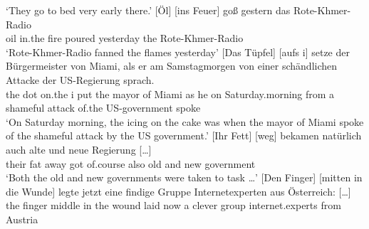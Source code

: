 \glt `They go to bed very early there.'
%
%
\ex 
\gll {}[Öl] [ins Feuer] goß gestern das Rote-Khmer-Radio\footnotemark\\
	 \spacebr{}oil \spacebr{}in.the fire poured yesterday the Rote-Khmer-Radio \\
\glt `Rote-Khmer-Radio fanned the flames yesterday'
\ex{}
\gll {}[Das Tüpfel] [aufs i] setze der Bürgermeister von Miami, als er am Samstagmorgen von einer schändlichen Attacke der US-Regierung sprach.\footnotemark\\
	  \spacebr{}the dot  \spacebr{}on.the i put the mayor of Miami as he on Saturday.morning from a shameful attack of.the US-government spoke\\
\glt `On Saturday morning, the icing on the cake was when the mayor of Miami spoke of the shameful attack by the US government.'
\ex 
\gll {}[Ihr Fett] [weg] bekamen natürlich auch alte und neue Regierung [\ldots]\footnotemark\\
	  \spacebr{}their fat \spacebr{}away got of.course also old and new government\\ 
\glt `Both the old and new governments were taken to task \ldots'
\ex 
\gll {}[Den Finger] [mitten in die Wunde] legte jetzt eine findige Gruppe Internetexperten aus Österreich: [\ldots]\footnotemark\\
	 \spacebr{}the finger \spacebr{}middle in the wound laid now a clever group internet.experts from Austria\\
